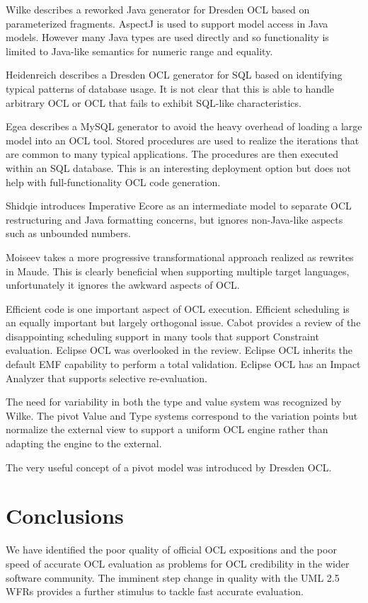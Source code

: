 \documentclass{acm_proc_article-sp}
\begin{document}
Wilke\cite{Dresden/JavaCG} describes a reworked  Java generator for Dresden OCL based on parameterized fragments.
AspectJ is used to support model access in Java models. However many Java types are used directly and so functionality is limited to Java-like semantics for numeric range and equality.

Heidenreich\cite{QueryCode} describes a Dresden OCL generator for SQL based on identifying typical patterns of database usage. It is not clear that this is able to handle arbitrary OCL or OCL that fails to exhibit SQL-like characteristics.

Egea\cite{MySQL4OCL} describes a MySQL generator to avoid the heavy overhead of loading a large model into an OCL tool. Stored procedures are used to realize the iterations that are common to many typical applications. The procedures are then executed within an SQL database. This is an interesting deployment option but does not help with full-functionality OCL code generation.

Shidqie\cite{Shidqie} introduces Imperative Ecore as an intermediate model to separate OCL restructuring and Java formatting concerns, but ignores non-Java-like aspects such as unbounded numbers.

Moiseev\cite{rodion-models2009} takes a more progressive transformational approach realized as rewrites in Maude. This is clearly beneficial when supporting multiple target languages, unfortunately it ignores the awkward aspects of OCL.

Efficient code is one important aspect of OCL execution. Efficient scheduling is an equally important
but largely orthogonal issue. 
Cabot\cite{Constraint-Survey} provides a review of the disappointing scheduling
support in many tools that support Constraint evaluation.
Eclipse OCL was overlooked in the review. Eclipse OCL inherits the default EMF capability
to perform a total validation. Eclipse OCL has an Impact Analyzer that supports selective re-evaluation.

The need for variability in both the type and value system was recognized by Wilke\cite{Variability}. The pivot Value
and Type systems correspond to the variation points but normalize the external view to support a uniform OCL engine rather than adapting the engine to the external.

The very useful concept of a pivot\cite{Pivot} model was introduced by Dresden OCL.

\section{Conclusions}
We have identified the poor quality of official OCL expositions and the poor speed of accurate OCL
evaluation as problems for OCL credibility in the wider software community. The imminent step
change in quality with the UML 2.5 WFRs provides a further stimulus to tackle fast accurate evaluation.
\end{document}
